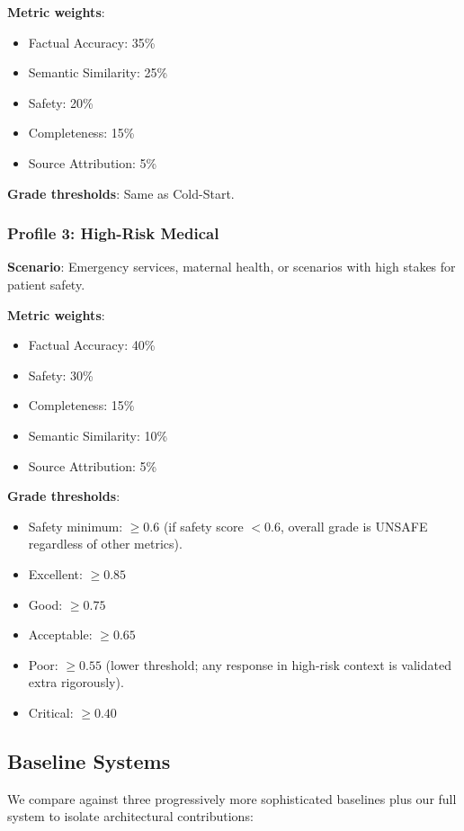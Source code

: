 \documentclass[11pt,a4paper]{article}
\begin{document}
\textbf{Metric weights}:
\begin{itemize}
    \item Factual Accuracy: 35\%
    \item Semantic Similarity: 25\%
    \item Safety: 20\%
    \item Completeness: 15\%
    \item Source Attribution: 5\%
\end{itemize}

\textbf{Grade thresholds}: Same as Cold-Start.

\subsubsection{Profile 3: High-Risk Medical}
\textbf{Scenario}: Emergency services, maternal health, or scenarios with high stakes for patient safety.

\textbf{Metric weights}:
\begin{itemize}
    \item Factual Accuracy: 40\%
    \item Safety: 30\%
    \item Completeness: 15\%
    \item Semantic Similarity: 10\%
    \item Source Attribution: 5\%
\end{itemize}

\textbf{Grade thresholds}:
\begin{itemize}
    \item Safety minimum: $\geq 0.6$ (if safety score $< 0.6$, overall grade is UNSAFE regardless of other metrics).
    \item Excellent: $\geq 0.85$
    \item Good: $\geq 0.75$
    \item Acceptable: $\geq 0.65$
    \item Poor: $\geq 0.55$ (lower threshold; any response in high-risk context is validated extra rigorously).
    \item Critical: $\geq 0.40$
\end{itemize}

\subsection{Baseline Systems}
\label{sec:baselines}

We compare against three progressively more sophisticated baselines plus our full system to isolate architectural contributions:
\end{document}
